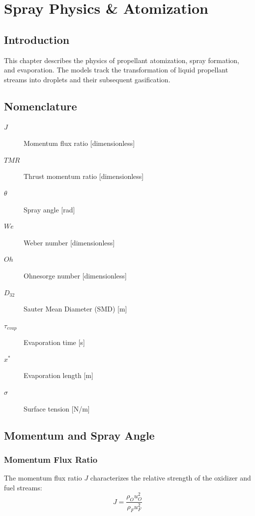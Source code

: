 \section{Spray Physics \& Atomization}

\subsection{Introduction}
This chapter describes the physics of propellant atomization, spray formation, and evaporation. The models track the transformation of liquid propellant streams into droplets and their subsequent gasification.

\subsection{Nomenclature}
\begin{description}
    \item[\(J\)] Momentum flux ratio [dimensionless]
    \item[\(TMR\)] Thrust momentum ratio [dimensionless]
    \item[\(\theta\)] Spray angle [\si{rad}]
    \item[\(We\)] Weber number [dimensionless]
    \item[\(Oh\)] Ohnesorge number [dimensionless]
    \item[\(D_{32}\)] Sauter Mean Diameter (SMD) [\si{m}]
    \item[\(\tau_{evap}\)] Evaporation time [\si{s}]
    \item[\(x^*\)] Evaporation length [\si{m}]
    \item[\(\sigma\)] Surface tension [\si{N/m}]
\end{description}

\subsection{Momentum and Spray Angle}

\subsubsection{Momentum Flux Ratio}
The momentum flux ratio \(J\) characterizes the relative strength of the oxidizer and fuel streams:
\begin{equation}
J = \frac{\rho_O u_O^2}{\rho_F u_F^2}
\end{equation}

